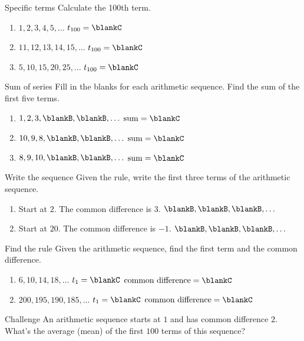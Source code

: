 \documentclass[12pt,letterpaper]{article}
\begin{document}
\begin{problem}{Specific terms}
 Calculate the 100th term.

 \begin{enumerate}[\hspace{.5cm}a.]
  \item $1, 2, 3, 4, 5, \ldots$ \hfill $t_{100} = \blankC$
  \item $11, 12, 13, 14, 15, \ldots$ \hfill $t_{100} = \blankC$
  \item $5, 10, 15, 20, 25, \ldots$ \hfill $t_{100} = \blankC$
 \end{enumerate}
\end{problem}

\begin{problem}{Sum of series}
 Fill in the blanks for each arithmetic sequence. Find the sum of the first five terms.

 \begin{enumerate}[\hspace{.5cm}a.]
  \item $1, 2, 3, \blankB, \blankB, \ldots$
  \hfill $\text{sum} = \blankC$
  \item $10, 9, 8, \blankB, \blankB, \ldots$
  \hfill $\text{sum} = \blankC$
  \item $8, 9, 10, \blankB, \blankB, \ldots$
  \hfill $\text{sum} = \blankC$
 \end{enumerate}
\end{problem}

\begin{problem}{Write the sequence}
 Given the rule, write the first three terms of the arithmetic sequence.

 \begin{enumerate}[\hspace{.5cm}a.]
  \item Start at $2$. The common difference is $3$.
  \hfill $\blankB, \blankB, \blankB, \ldots$
  \item Start at $20$. The common difference is $-1$.
  \hfill $\blankB, \blankB, \blankB, \ldots$
 \end{enumerate}
\end{problem}

\begin{problem}{Find the rule}
 Given the arithmetic sequence, find the first term and the common difference.

 \begin{enumerate}[\hspace{.5cm}a.]
  \item $6, 10, 14, 18, \ldots$ \hfill $t_1 = \blankC$
  $\text{common difference} = \blankC$
  \item $200, 195, 190, 185, \ldots$ \hfill $t_1 = \blankC$
  $\text{common difference} = \blankC$
 \end{enumerate}
\end{problem}

\begin{problem}{Challenge}
 An arithmetic sequence starts at $1$ and has common difference $2$.
 What's the average (mean) of the first $100$ terms of this sequence?
\end{problem}
\end{document}
